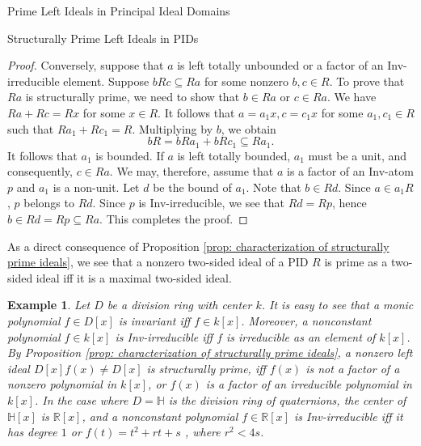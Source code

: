 \documentclass[11pt,a4paper]{article}
\theoremstyle{theorem}
\newtheorem{example}{Example}[section]
\numberwithin{equation}{section}
\begin{document}
\begin{section}{Prime Left Ideals in Principal Ideal Domains}
\begin{subsection}{Structurally Prime Left Ideals in PIDs}
\begin{proof}
			
			Conversely, suppose that \( a \) is  left totally unbounded or a factor of an Inv-irreducible element. Suppose \(bRc\subseteq Ra\) for some nonzero \(b,c\in R\). To prove that \(Ra\) is structurally prime, we need to show that \(b\in Ra\) or \(c\in Ra\). We have \(Ra+Rc=Rx\) for some \(x\in R\). It follows that \(a=a_1x, c=c_1x\) for some \(a_1,c_1\in R\) such that \(Ra_1+Rc_1=R\). Multiplying by \(b\), we obtain 
			\[	
			bR =  bRa_1 + bRc_1 \subseteq Ra_1.
			\]			
			It follows that \(a_1\) is bounded. If \(a\) is left totally bounded, \(a_1\) must be a unit, and consequently, \(c\in Ra\). We may, therefore, assume that \( a \) is  a factor of an Inv-atom \(p\) and \(a_1\) is a non-unit. Let \(d\) be the bound of \(a_1\). Note that \(b\in Rd\). Since \(a\in a_1R\), \(p\) belongs to \(Rd\). Since \(p\) is Inv-irreducible, we see that \(Rd = Rp\), hence \(b\in Rd = Rp\subseteq Ra\). This completes the proof.  
		\end{proof}
		As a direct consequence of Proposition \ref{prop: characterization of structurally prime ideals}, we see that a nonzero two-sided ideal of a PID \(R\) is prime as a two-sided ideal iff it is a maximal two-sided ideal. 
		\begin{example}\label{exam: structurally prime ideals in D[x]}
			Let \(D\) be a division ring with center \(k\). It is easy to see that a  monic polynomial \(f\in D[x]\) is invariant iff \(f\in k[x]\). Moreover, a nonconstant polynomial \(f\in k[x]\) is Inv-irreducible iff \(f\) is irreducible as an element of \(k[x]\). By Proposition \ref{prop: characterization of structurally prime ideals}, a nonzero left ideal \(D[x] f(x) \neq D[x]\) is structurally prime, iff \(f(x)\) is not a factor of a nonzero  polynomial in \(k[x]\), or \(f(x)\) is a factor of an irreducible polynomial in \(k[x]\). In the case where \(D = \mathbb{H}\) is the division ring of quaternions, the center of \( \mathbb{H}[x]\) is \( \mathbb{R}[x]\),  and  a nonconstant polynomial \(f\in \mathbb{R}[x]\) is Inv-irreducible iff it has degree \(1\) or \(f(t) = t^2+rt+s\) , where \(r^2<4s\). 
		\end{example}
		

\end{subsection}
\end{section}
\end{document}
